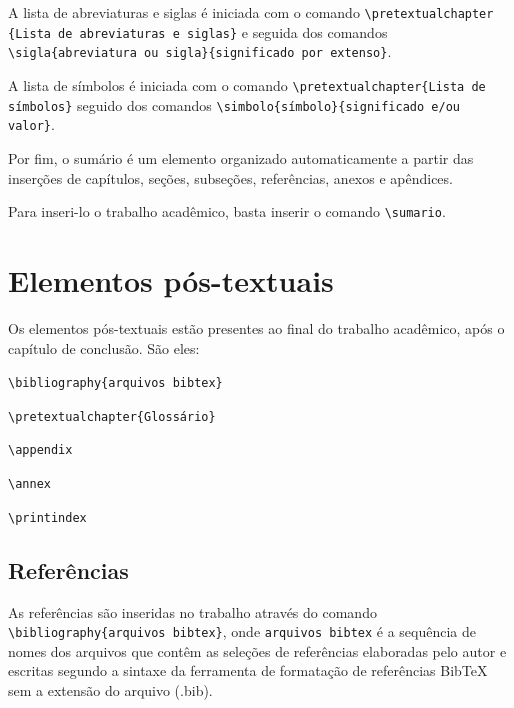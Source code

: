 \documentclass[a4paper,12pt,oneside,onecolumn,final,fleqn]{repUERJ}
\begin{document}
A lista de abreviaturas e siglas é iniciada com o comando \texttt{\textbackslash pretextualchapter \{Lista de abreviaturas e siglas\}} e seguida dos comandos \texttt{\textbackslash sigla\{abreviatura ou sigla\}\{significado por extenso\}}.

A lista de símbolos é iniciada com o comando \texttt{\textbackslash pretextualchapter\{Lista de símbolos\}} seguido dos comandos \texttt{\textbackslash simbolo\{símbolo\}\{significado e/ou valor\}}.

Por fim, o sumário é um elemento organizado automaticamente a partir das inserções de capítulos, seções, subseções, referências, anexos e apêndices.

Para inseri-lo o trabalho acadêmico, basta inserir o comando \texttt{\textbackslash sumario}.

\chapter{Elementos pós-textuais}

Os elementos pós-textuais estão presentes ao final do trabalho acadêmico, após o capítulo de conclusão. São eles:
\begin{alinea}
\item {} 
		\texttt{\textbackslash bibliography\{arquivos bibtex\}}
\item {} 
		\texttt{\textbackslash pretextualchapter\{Glossário\}}
\item {} 
		\texttt{\textbackslash appendix}
\item {} 
		\texttt{\textbackslash annex}
\item {} 
		\texttt{\textbackslash printindex}
\end{alinea}

\section{Referências}

As referências são inseridas no trabalho através do comando \texttt{\textbackslash bibliography\{ar\-quivos bibtex\}}, onde \texttt{arquivos bibtex} é a sequência de nomes dos arquivos que contêm as seleções de referências elaboradas pelo autor e escritas segundo a sintaxe da ferramenta de formatação de referências \textsf{BibTeX} sem a extensão do arquivo (.bib).
\end{document}

